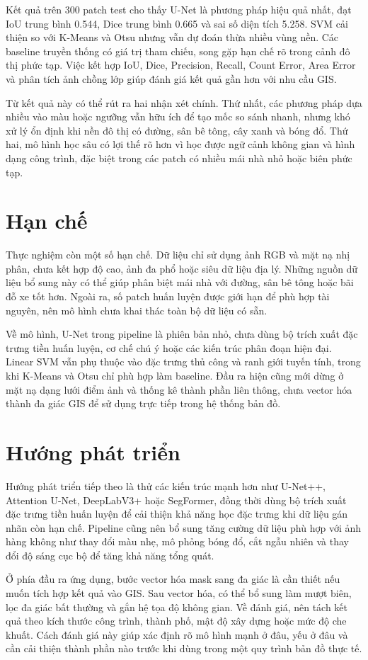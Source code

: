 \documentclass[12pt,a4paper]{report}
\begin{document}
Kết quả trên 300 patch test cho thấy U-Net là phương pháp hiệu quả nhất, đạt IoU trung bình 0.544, Dice trung bình 0.665 và sai số diện tích 5.258. SVM cải thiện so với K-Means và Otsu nhưng vẫn dự đoán thừa nhiều vùng nền. Các baseline truyền thống có giá trị tham chiếu, song gặp hạn chế rõ trong cảnh đô thị phức tạp. Việc kết hợp IoU, Dice, Precision, Recall, Count Error, Area Error và phân tích ảnh chồng lớp giúp đánh giá kết quả gần hơn với nhu cầu GIS.

Từ kết quả này có thể rút ra hai nhận xét chính. Thứ nhất, các phương pháp dựa nhiều vào màu hoặc ngưỡng vẫn hữu ích để tạo mốc so sánh nhanh, nhưng khó xử lý ổn định khi nền đô thị có đường, sân bê tông, cây xanh và bóng đổ. Thứ hai, mô hình học sâu có lợi thế rõ hơn vì học được ngữ cảnh không gian và hình dạng công trình, đặc biệt trong các patch có nhiều mái nhà nhỏ hoặc biên phức tạp.

\section*{Hạn chế}

Thực nghiệm còn một số hạn chế. Dữ liệu chỉ sử dụng ảnh RGB và mặt nạ nhị phân, chưa kết hợp độ cao, ảnh đa phổ hoặc siêu dữ liệu địa lý. Những nguồn dữ liệu bổ sung này có thể giúp phân biệt mái nhà với đường, sân bê tông hoặc bãi đỗ xe tốt hơn. Ngoài ra, số patch huấn luyện được giới hạn để phù hợp tài nguyên, nên mô hình chưa khai thác toàn bộ dữ liệu có sẵn.

Về mô hình, U-Net trong pipeline là phiên bản nhỏ, chưa dùng bộ trích xuất đặc trưng tiền huấn luyện, cơ chế chú ý hoặc các kiến trúc phân đoạn hiện đại. Linear SVM vẫn phụ thuộc vào đặc trưng thủ công và ranh giới tuyến tính, trong khi K-Means và Otsu chỉ phù hợp làm baseline. Đầu ra hiện cũng mới dừng ở mặt nạ dạng lưới điểm ảnh và thống kê thành phần liên thông, chưa vector hóa thành đa giác GIS để sử dụng trực tiếp trong hệ thống bản đồ.

\section*{Hướng phát triển}

Hướng phát triển tiếp theo là thử các kiến trúc mạnh hơn như U-Net++, Attention U-Net, DeepLabV3+ hoặc SegFormer, đồng thời dùng bộ trích xuất đặc trưng tiền huấn luyện để cải thiện khả năng học đặc trưng khi dữ liệu gán nhãn còn hạn chế. Pipeline cũng nên bổ sung tăng cường dữ liệu phù hợp với ảnh hàng không như thay đổi màu nhẹ, mô phỏng bóng đổ, cắt ngẫu nhiên và thay đổi độ sáng cục bộ để tăng khả năng tổng quát.

Ở phía đầu ra ứng dụng, bước vector hóa mask sang đa giác là cần thiết nếu muốn tích hợp kết quả vào GIS. Sau vector hóa, có thể bổ sung làm mượt biên, lọc đa giác bất thường và gắn hệ tọa độ không gian. Về đánh giá, nên tách kết quả theo kích thước công trình, thành phố, mật độ xây dựng hoặc mức độ che khuất. Cách đánh giá này giúp xác định rõ mô hình mạnh ở đâu, yếu ở đâu và cần cải thiện thành phần nào trước khi dùng trong một quy trình bản đồ thực tế.

\clearpage


\end{document}
